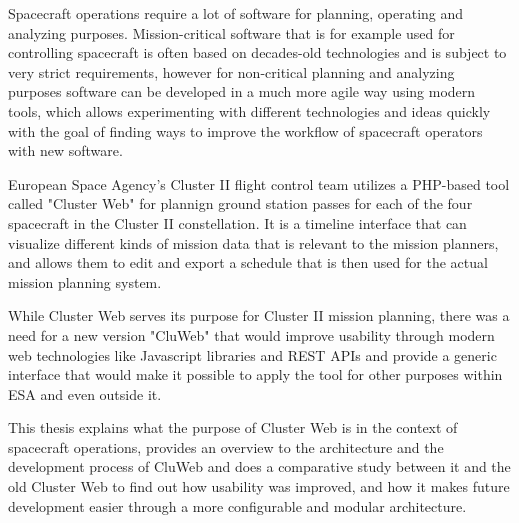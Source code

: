 Spacecraft operations require a lot of software for planning, operating and analyzing purposes. Mission-critical software that is for example used for controlling spacecraft is often based on decades-old technologies and is subject to very strict requirements, however for non-critical planning and analyzing purposes software can be developed in a much more agile way using modern tools, which allows experimenting with different technologies and ideas quickly with the goal of finding ways to improve the workflow of spacecraft operators with new software.

European Space Agency's Cluster II flight control team utilizes a PHP-based tool called "Cluster Web" for plannign ground station passes for each of the four spacecraft in the Cluster II constellation. It is a timeline interface that can visualize different kinds of mission data that is relevant to the mission planners, and allows them to edit and export a schedule that is then used for the actual mission planning system.

While Cluster Web serves its purpose for Cluster II mission planning, there was a need for a new version "CluWeb" that would improve usability through modern web technologies like Javascript libraries and REST APIs and provide a generic interface that would make it possible to apply the tool for other purposes within ESA and even outside it.

This thesis explains what the purpose of Cluster Web is in the context of spacecraft operations, provides an overview to the architecture and the development process of CluWeb and does a comparative study between it and the old Cluster Web to find out how usability was improved, and how it makes future development easier through a more configurable and modular architecture.